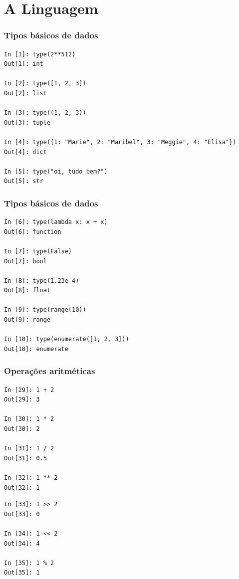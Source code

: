 \documentclass[aspectratio=169]{beamer}
\begin{document}

\section{A Linguagem}

\begin{frame}[fragile]
	\frametitle{Tipos básicos de dados}
	\begin{lstlisting}
In [1]: type(2**512)
Out[1]: int

In [2]: type([1, 2, 3])
Out[2]: list

In [3]: type((1, 2, 3))
Out[3]: tuple

In [4]: type({1: "Marie", 2: "Maribel", 3: "Meggie", 4: "Elisa"})
Out[4]: dict

In [5]: type("oi, tudo bem?")
Out[5]: str
	\end{lstlisting}
\end{frame}

\begin{frame}[fragile]
	\frametitle{Tipos básicos de dados}
	\begin{lstlisting}
In [6]: type(lambda x: x + x)
Out[6]: function

In [7]: type(False)
Out[7]: bool

In [8]: type(1.23e-4)
Out[8]: float

In [9]: type(range(10))
Out[9]: range

In [10]: type(enumerate([1, 2, 3]))
Out[10]: enumerate
	\end{lstlisting}
\end{frame}

\begin{frame}[fragile]
	\frametitle{Operações aritméticas}

	\noindent\begin{minipage}{.5\textwidth}
		\begin{lstlisting}
In [29]: 1 + 2
Out[29]: 3

In [30]: 1 * 2
Out[30]: 2

In [31]: 1 / 2
Out[31]: 0.5

In [32]: 1 ** 2
Out[32]: 1
		\end{lstlisting}
		\end{minipage}\hfill
		\begin{minipage}{.45\textwidth}
		\begin{lstlisting}
In [33]: 1 >> 2
Out[33]: 0

In [34]: 1 << 2
Out[34]: 4

In [35]: 1 % 2
Out[35]: 1
		\end{lstlisting}
	\end{minipage}
\end{frame}
\end{document}

